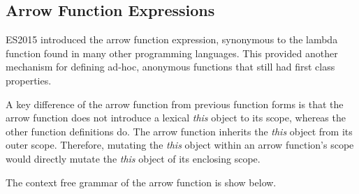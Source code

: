 \subsection{Arrow Function Expressions}
ES2015\parencite{es2015} introduced the arrow function expression, synonymous to the lambda function found in many other programming languages. This provided another mechanism for defining ad-hoc, anonymous functions that still had first class properties.

A key difference of the arrow function from previous function forms is that the arrow function does not introduce a lexical \textit{this} object to its scope, whereas the other function definitions do. The arrow function inherits the \textit{this} object from its outer scope. Therefore, mutating the \textit{this} object within an arrow function's scope would directly mutate the \textit{this} object of its enclosing scope.

The context free grammar of the arrow function is show below.

\begin{bnf*}
  { \bnfsp \bnfts{=>} \bnfsp {} }\\
  {}\\
  \\
  {}\\
\end{bnf*}
